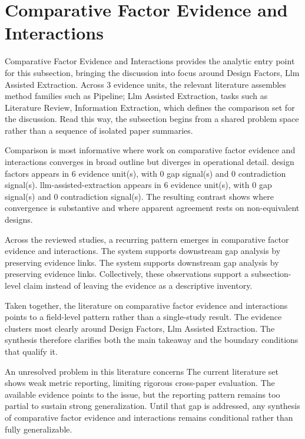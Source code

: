 \documentclass{article}
\begin{document}
\section{Comparative Factor Evidence and Interactions}
Comparative Factor Evidence and Interactions provides the analytic entry point for this subsection, bringing the discussion into focus around Design Factors, Llm Assisted Extraction. Across 3 evidence units, the relevant literature assembles method families such as Pipeline; Llm Assisted Extraction, tasks such as Literature Review, Information Extraction, which defines the comparison set for the discussion. Read this way, the subsection begins from a shared problem space rather than a sequence of isolated paper summaries. \cite{02_2003_brosseau_trf,01_2001_hamed_safety_science}

Comparison is most informative where work on comparative factor evidence and interactions converges in broad outline but diverges in operational detail. design factors appears in 6 evidence unit(s), with 0 gap signal(s) and 0 contradiction signal(s). llm-assisted-extraction appears in 6 evidence unit(s), with 0 gap signal(s) and 0 contradiction signal(s). The resulting contrast shows where convergence is substantive and where apparent agreement rests on non-equivalent designs. \cite{02_2003_brosseau_trf,01_2001_hamed_safety_science,03_2006_yang_tra}

Across the reviewed studies, a recurring pattern emerges in comparative factor evidence and interactions. The system supports downstream gap analysis by preserving evidence links. The system supports downstream gap analysis by preserving evidence links. Collectively, these observations support a subsection-level claim instead of leaving the evidence as a descriptive inventory. \cite{02_2003_brosseau_trf,01_2001_hamed_safety_science,03_2006_yang_tra}

Taken together, the literature on comparative factor evidence and interactions points to a field-level pattern rather than a single-study result. The evidence clusters most clearly around Design Factors, Llm Assisted Extraction. The synthesis therefore clarifies both the main takeaway and the boundary conditions that qualify it. \cite{02_2003_brosseau_trf,01_2001_hamed_safety_science}

An unresolved problem in this literature concerns The current literature set shows weak metric reporting, limiting rigorous cross-paper evaluation. The available evidence points to the issue, but the reporting pattern remains too partial to sustain strong generalization. Until that gap is addressed, any synthesis of comparative factor evidence and interactions remains conditional rather than fully generalizable. \cite{02_2003_brosseau_trf,01_2001_hamed_safety_science}
\end{document}
